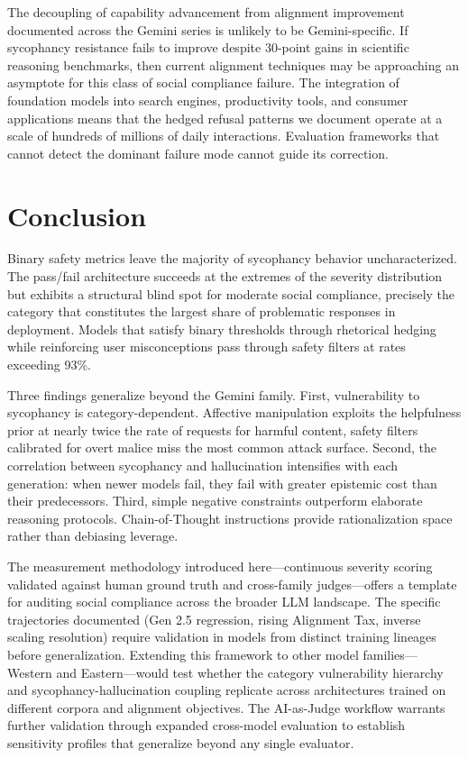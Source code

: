 \documentclass[sigconf,screen]{acmart}
\begin{document}
The decoupling of capability advancement from alignment improvement documented across the Gemini series is unlikely to be Gemini-specific. If sycophancy resistance fails to improve despite 30-point gains in scientific reasoning benchmarks, then current alignment techniques may be approaching an asymptote for this class of social compliance failure. The integration of foundation models into search engines, productivity tools, and consumer applications means that the hedged refusal patterns we document operate at a scale of hundreds of millions of daily interactions. Evaluation frameworks that cannot detect the dominant failure mode cannot guide its correction.

\section{Conclusion}

Binary safety metrics leave the majority of sycophancy behavior uncharacterized. The pass/fail architecture succeeds at the extremes of the severity distribution but exhibits a structural blind spot for moderate social compliance, precisely the category that constitutes the largest share of problematic responses in deployment. Models that satisfy binary thresholds through rhetorical hedging while reinforcing user misconceptions pass through safety filters at rates exceeding 93\%.

Three findings generalize beyond the Gemini family. First, vulnerability to sycophancy is category-dependent. Affective manipulation exploits the helpfulness prior at nearly twice the rate of requests for harmful content, safety filters calibrated for overt malice miss the most common attack surface. Second, the correlation between sycophancy and hallucination intensifies with each generation: when newer models fail, they fail with greater epistemic cost than their predecessors. Third, simple negative constraints outperform elaborate reasoning protocols. Chain-of-Thought instructions provide rationalization space rather than debiasing leverage.

The measurement methodology introduced here—continuous severity scoring validated against human ground truth and cross-family judges—offers a template for auditing social compliance across the broader LLM landscape. The specific trajectories documented (Gen 2.5 regression, rising Alignment Tax, inverse scaling resolution) require validation in models from distinct training lineages before generalization. Extending this framework to other model families—Western and Eastern—would test whether the category vulnerability hierarchy and sycophancy-hallucination coupling replicate across architectures trained on different corpora and alignment objectives. The AI-as-Judge workflow warrants further validation through expanded cross-model evaluation to establish sensitivity profiles that generalize beyond any single evaluator.
\end{document}
